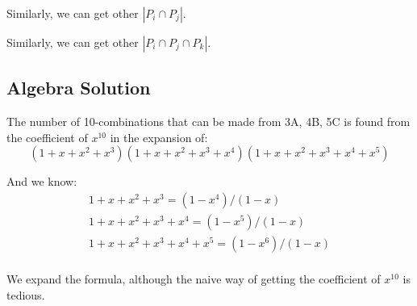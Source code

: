 Similarly, we can get other $|P_i \cap P_j|$.

Similarly, we can get other $|P_i \cap P_j \cap P_k|$.
\subsection{Algebra Solution}
The number of 10-combinations that can be made from 3A, 4B, 5C is found from the coefficient of $x^{10}$ in the expansion of:
$$
(1+x+x^2+x^3)(1+x+x^2+x^3+x^4)(1+x+x^2+x^3+x^4+x^5)
$$

And we know:
\begin{eqnarray*}
1+x+x^2+x^3         = (1-x^4)/(1-x)  \\
1+x+x^2+x^3+x^4     = (1-x^5)/(1-x)  \\
1+x+x^2+x^3+x^4+x^5 = (1-x^6)/(1-x)  \\
\end{eqnarray*}


We expand the formula, although the  naive way of getting the coefficient of $x^{10}$ is tedious. 
